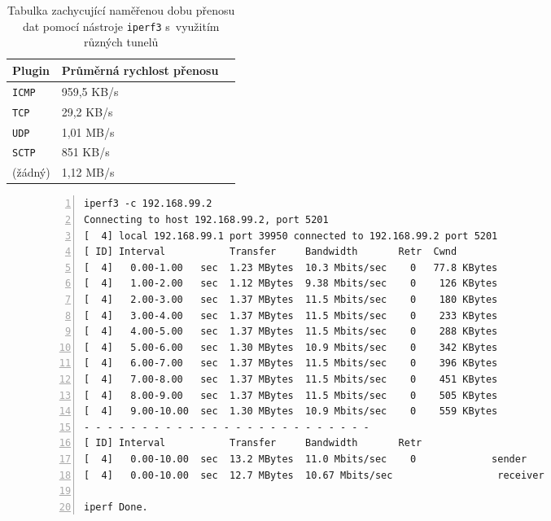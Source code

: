 \documentclass[thesis=M,czech]{FITthesis}[2012/10/20]
\begin{document}
    \begin{table}[h]
	\centering
	\begin{tabular}{|l||l|l|}
	\hline
	Plugin   & Průměrná rychlost přenosu \\ \hline \hline
	\texttt{ICMP}      & 959,5 KB/s                 \\ \hline
	\texttt{TCP}       & 29,2 KB/s                \\ \hline
	\texttt{UDP}       & 1,01 MB/s                 \\ \hline
	\texttt{SCTP}       & 851 KB/s                  \\ \hline
	(žádný)   & 1,12 MB/s                 \\ \hline
	\end{tabular}
	\caption{Tabulka zachycující naměřenou dobu přenosu dat pomocí nástroje \texttt{iperf3} s~využitím různých tunelů}
	\label{tab:iperf-download}
    \end{table}
  
  
    \begin{figure}[h]
	\begin{lstlisting}[label=code:iperf,caption=Ukázkový výstup nástroje \texttt{iperf3},frame=single,numbers=left, linewidth=1.1\textwidth]
  iperf3 -c 192.168.99.2
Connecting to host 192.168.99.2, port 5201
[  4] local 192.168.99.1 port 39950 connected to 192.168.99.2 port 5201
[ ID] Interval           Transfer     Bandwidth       Retr  Cwnd
[  4]   0.00-1.00   sec  1.23 MBytes  10.3 Mbits/sec    0   77.8 KBytes       
[  4]   1.00-2.00   sec  1.12 MBytes  9.38 Mbits/sec    0    126 KBytes       
[  4]   2.00-3.00   sec  1.37 MBytes  11.5 Mbits/sec    0    180 KBytes       
[  4]   3.00-4.00   sec  1.37 MBytes  11.5 Mbits/sec    0    233 KBytes       
[  4]   4.00-5.00   sec  1.37 MBytes  11.5 Mbits/sec    0    288 KBytes       
[  4]   5.00-6.00   sec  1.30 MBytes  10.9 Mbits/sec    0    342 KBytes       
[  4]   6.00-7.00   sec  1.37 MBytes  11.5 Mbits/sec    0    396 KBytes       
[  4]   7.00-8.00   sec  1.37 MBytes  11.5 Mbits/sec    0    451 KBytes       
[  4]   8.00-9.00   sec  1.37 MBytes  11.5 Mbits/sec    0    505 KBytes       
[  4]   9.00-10.00  sec  1.30 MBytes  10.9 Mbits/sec    0    559 KBytes       
- - - - - - - - - - - - - - - - - - - - - - - - -
[ ID] Interval           Transfer     Bandwidth       Retr
[  4]   0.00-10.00  sec  13.2 MBytes  11.0 Mbits/sec    0             sender
[  4]   0.00-10.00  sec  12.7 MBytes  10.67 Mbits/sec                  receiver

iperf Done.
      \end{lstlisting}
    \end{figure}
\end{document}
